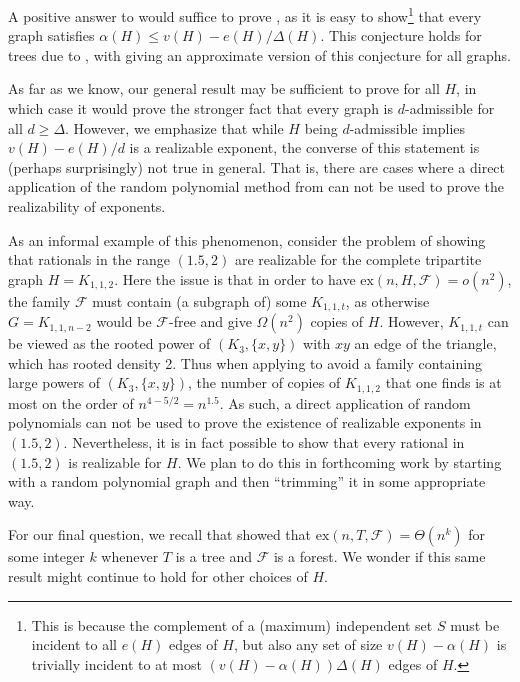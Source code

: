 \documentclass[12pt,letterpaper]{article}
\theoremstyle{definition}
\newcommand{\ex}{\mathrm{ex}}
\renewcommand{\c}[1]{\mathcal{#1}}
\newcommand{\Om}{\Omega}
\newcommand{\Del}{\Delta}
\newcommand{\al}{\alpha}
\begin{document}
	A positive answer to  would suffice to prove , as it is easy to show\footnote{This is because the complement of a (maximum) independent set $S$ must be incident to all $e(H)$ edges of $H$, but also any set of size $v(H)-\al(H)$ is trivially incident to at most $(v(H)-\al(H))\Del(H)$ edges of $H$.} that every graph satisfies $\al(H)\le v(H)-e(H)/\Del(H)$.  This conjecture holds for trees due to , with  giving an approximate version of this conjecture for all graphs.
	
	As far as we know, our general result  may be sufficient to prove  for all $H$, in which case it would prove the stronger fact that every graph is $d$-admissible for all $d\ge \Del$.  However, we emphasize that while $H$ being $d$-admissible implies $v(H)-e(H)/d$ is a realizable exponent, the converse of this statement is (perhaps surprisingly) not true in general.  That is, there are cases where a direct application of the random polynomial method from  can not be used to prove the realizability of exponents. 
	
	As an informal example of this phenomenon, consider the problem of showing that rationals in the range $(1.5,2)$ are realizable for the complete tripartite graph $H=K_{1,1,2}$.  Here the  issue  is that in order to have $\ex(n,H,\c{F})=o(n^2)$, the family $\c{F}$ must contain (a subgraph of) some $K_{1,1,t}$, as otherwise $G=K_{1,1,n-2}$ would be $\c{F}$-free and give $\Om(n^2)$ copies of $H$.  However, $K_{1,1,t}$ can be viewed as the rooted power of $(K_3,\{x,y\})$ with $xy$ an edge of the triangle, which has rooted density 2.  Thus when applying  to avoid a family containing large powers of $(K_3,\{x,y\})$, the number of copies of $K_{1,1,2}$ that one finds is at most on the order of $n^{4-5/2}=n^{1.5}$.  As such, a direct application of random polynomials can not be used to prove the existence of realizable exponents in $(1.5,2)$.  Nevertheless, it is in fact possible to show that every rational in $(1.5,2)$ is realizable for $H$.  We plan to do this in forthcoming work by starting with a random polynomial graph and then ``trimming'' it in some appropriate way.
	
	For our final question, we recall that  showed that $\ex(n,T,\c{F})=\Theta(n^k)$ for some integer $k$ whenever $T$ is a tree and $\c{F}$ is a forest.  We wonder if this same result might continue to hold for other choices of $H$.
	
\end{document}
